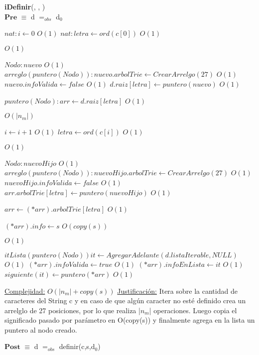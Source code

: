 \begin{algorithm}[H]{\textbf{iDefinir}(, , )}
	{\\ $\textbf{Pre}$ $\equiv$ d $=_{obs}$ d$_0$}
	\begin{algorithmic}


		\State $nat: i \gets 0$ \Comment $O(1)$
		\State $nat: letra \gets ord(c[0])$ \Comment $O(1)$
		
		 \Comment $O(1)$

			\State $Nodo: nuevo$ \Comment $O(1)$
			\State $arreglo(puntero(Nodo)): nuevo.arbolTrie \gets CrearArrelgo(27)$ \Comment $O(1)$
			\State $nuevo.infoValida \gets false$ \Comment $O(1)$
			\State $d.raiz[letra] \gets puntero(nuevo)$ \Comment $O(1)$

		\EndIf

		\State $puntero(Nodo): arr \gets d.raiz[letra]$ \Comment $O(1)$

		 \Comment $O(|n_m|)$

			\State $i \gets i + 1$ \Comment $O(1)$
			\State $letra \gets ord(c[i])$ \Comment $O(1)$

			 \Comment $O(1)$

				\State $Nodo: nuevoHijo$ \Comment $O(1)$
				\State $arreglo(puntero(Nodo)): nuevoHijo.arbolTrie \gets CrearArrelgo(27)$ \Comment $O(1)$
				\State $nuevoHijo.infoValida \gets false$ \Comment $O(1)$
				\State $arr.arbolTrie[letra] \gets puntero(nuevoHijo)$ \Comment $O(1)$

			\EndIf

			\State $arr \gets (*arr).arbolTrie[letra]$ \Comment $O(1)$

		\EndWhile

		\State $(*arr).info \gets s$ \Comment $O(copy(s))$

		 \Comment $O(1)$

		\State $itLista(puntero(Nodo)) it \gets AgregarAdelante(d.listaIterable,NULL)$ \Comment $O(1)$
		\State $(*arr).infoValida \gets true$ \Comment $O(1)$
		\State $(*arr).infoEnLista \gets it$ \Comment $O(1)$
		\State $siguiente(it) \gets puntero(*arr)$ \Comment $O(1)$

		\EndIf

		\medskip
		\Statex \underline{Complejidad:} $O(|n_m| + copy(s))$
		\Statex \underline{Justificación:} Itera sobre la cantidad de caracteres del String c y en caso de que algún caracter no esté definido crea un arrelglo de 27 posiciones, por lo que realiza |$n_m$| operaciones. Luego copia el significado pasado por parámetro en O(copy(s)) y finalmente agrega en la lista un puntero al nodo creado.
    \end{algorithmic}
    {$\textbf{Post}$ $\equiv$ d $=_{obs}$ definir(c,s,d$_0$)}
\end{algorithm}


